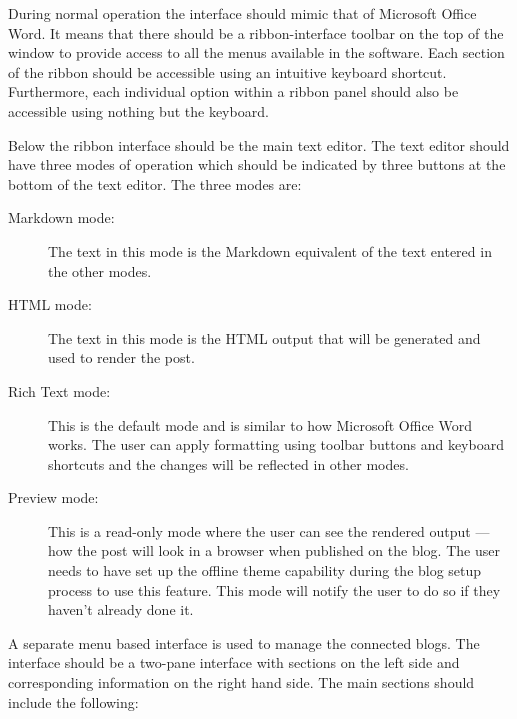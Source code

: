 
During normal operation the interface should mimic that of Microsoft Office Word. It means that there should be a
ribbon-interface toolbar on the top of the window to provide access to all the menus available in the software. Each
section of the ribbon should be accessible using an intuitive keyboard shortcut. Furthermore, each individual option
within a ribbon panel should also be accessible using nothing but the keyboard.

Below the ribbon interface should be the main text editor. The text editor should have three modes of operation which
should be indicated by three buttons at the bottom of the text editor. The three modes are:

\begin{description}
    \item [Markdown mode:] The text in this mode is the Markdown equivalent of the text entered in the other modes.
    \item [HTML mode:] The text in this mode is the HTML output that will be generated and used to render the post.
    \item [Rich Text mode:] This is the default mode and is similar to how Microsoft Office Word works. The user can
          apply formatting using toolbar buttons and keyboard shortcuts and the changes will be reflected in other
          modes.
    \item [Preview mode:] This is a read-only mode where the user can see the rendered output --- how the post will look
          in a browser when published on the blog. The user needs to have set up the offline theme capability during
          the blog setup process to use this feature. This mode will notify the user to do so if they haven't already
          done it.
\end{description}


A separate menu based interface is used to manage the connected blogs. The interface should be a two-pane interface with
sections on the left side and corresponding information on the right hand side. The main sections should include the
following:

